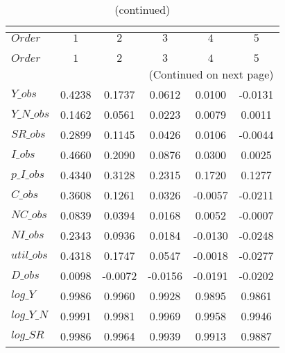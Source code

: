  
\begin{center}
\begin{longtable}{lccccc} 
\caption{COEFFICIENTS OF AUTOCORRELATION}\\
 \label{Table:th_autocorr_matrix}\\
\toprule 
$Order      $	 & 	 $         1$	 & 	 $         2$	 & 	 $         3$	 & 	 $         4$	 & 	 $         5$\\
\midrule \endfirsthead 
\caption{(continued)}\\
 \toprule \\ 
$Order      $	 & 	 $         1$	 & 	 $         2$	 & 	 $         3$	 & 	 $         4$	 & 	 $         5$\\
\midrule \endhead 
\midrule \multicolumn{6}{r}{(Continued on next page)} \\ \bottomrule \endfoot 
\bottomrule \endlastfoot 
$Y\_obs     $	 & 	    0.4238	 & 	    0.1737	 & 	    0.0612	 & 	    0.0100	 & 	   -0.0131 \\ 
$Y\_N\_obs  $	 & 	    0.1462	 & 	    0.0561	 & 	    0.0223	 & 	    0.0079	 & 	    0.0011 \\ 
$SR\_obs    $	 & 	    0.2899	 & 	    0.1145	 & 	    0.0426	 & 	    0.0106	 & 	   -0.0044 \\ 
$I\_obs     $	 & 	    0.4660	 & 	    0.2090	 & 	    0.0876	 & 	    0.0300	 & 	    0.0025 \\ 
$p\_I\_obs  $	 & 	    0.4340	 & 	    0.3128	 & 	    0.2315	 & 	    0.1720	 & 	    0.1277 \\ 
$C\_obs     $	 & 	    0.3608	 & 	    0.1261	 & 	    0.0326	 & 	   -0.0057	 & 	   -0.0211 \\ 
$NC\_obs    $	 & 	    0.0839	 & 	    0.0394	 & 	    0.0168	 & 	    0.0052	 & 	   -0.0007 \\ 
$NI\_obs    $	 & 	    0.2343	 & 	    0.0936	 & 	    0.0184	 & 	   -0.0130	 & 	   -0.0248 \\ 
$util\_obs  $	 & 	    0.4318	 & 	    0.1747	 & 	    0.0547	 & 	   -0.0018	 & 	   -0.0277 \\ 
$D\_obs     $	 & 	    0.0098	 & 	   -0.0072	 & 	   -0.0156	 & 	   -0.0191	 & 	   -0.0202 \\ 
$log\_Y     $	 & 	    0.9986	 & 	    0.9960	 & 	    0.9928	 & 	    0.9895	 & 	    0.9861 \\ 
$log\_Y\_N  $	 & 	    0.9991	 & 	    0.9981	 & 	    0.9969	 & 	    0.9958	 & 	    0.9946 \\ 
$log\_SR    $	 & 	    0.9986	 & 	    0.9964	 & 	    0.9939	 & 	    0.9913	 & 	    0.9887 \\ 

\end{longtable}
\end{center}
